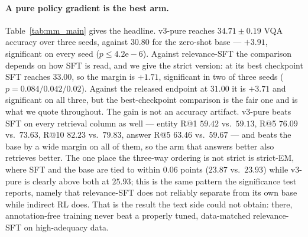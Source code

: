 \paragraph{A pure policy gradient is the best arm.} Table~\ref{tab:mm_main} gives the headline.
v3-pure reaches $34.71 \pm 0.19$ VQA accuracy over three seeds, against $30.80$ for the
zero-shot base --- $+3.91$, significant on every seed ($p \le 4.2\mathrm{e}{-}6$). Against
relevance-SFT the comparison depends on how SFT is read, and we give the strict version: at its
best checkpoint SFT reaches $33.00$, so the margin is $+1.71$, significant in two of three seeds
($p{=}0.084 / 0.042 / 0.02$). Against the released endpoint at $31.00$ it is $+3.71$ and
significant on all three, but the best-checkpoint comparison is the fair one and is what we quote
throughout. The gain is not an accuracy artifact. v3-pure beats SFT on
every retrieval column as well --- entity R@1 $59.42$ vs.\ $59.13$, R@5 $76.09$ vs.\ $73.63$,
R@10 $82.23$ vs.\ $79.83$, answer R@5 $63.46$ vs.\ $59.67$ --- and beats the base by a wide
margin on all of them, so the arm that answers better also retrieves better. The one place the
three-way ordering is not strict is strict-EM, where SFT and the base are tied to within
$0.06$ points ($23.87$ vs.\ $23.93$) while v3-pure is clearly above both at $25.93$; this is the
same pattern the significance test reports, namely that relevance-SFT does not reliably separate
from its own base while indirect RL does. That is the result the text side could not obtain:
there, annotation-free training never beat a properly tuned, data-matched relevance-SFT on
high-adequacy data.

